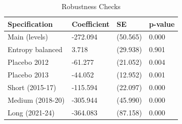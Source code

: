 \begin{table}[!h]
\centering
\caption{\label{tab:tab:robustness}Robustness Checks}
\centering
\begin{tabular}[t]{llll}
\toprule
Specification & Coefficient & SE & p-value\\
\midrule
Main (levels) & -272.094 & (50.565) & 0.000\\
Entropy balanced & 3.718 & (29.938) & 0.901\\
Placebo 2012 & -61.277 & (21.052) & 0.004\\
Placebo 2013 & -44.052 & (12.952) & 0.001\\
Short (2015-17) & -115.594 & (22.097) & 0.000\\
\addlinespace
Medium (2018-20) & -305.944 & (45.990) & 0.000\\
Long (2021-24) & -364.083 & (87.158) & 0.000\\
\bottomrule
\end{tabular}
\end{table}
